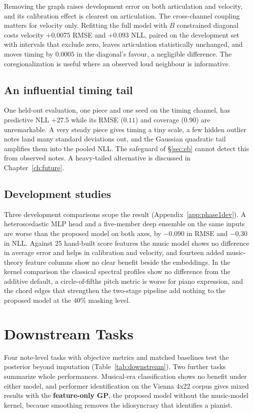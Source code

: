 \documentclass[11pt,a4paper]{report}
\begin{document}
\noindent Removing the graph raises development error on both
articulation and velocity, and its calibration effect is clearest on
articulation. The cross-channel coupling matters for velocity only. Refitting the
full model with $B$ constrained diagonal costs velocity $+0.0075$ RMSE and
$+0.093$ NLL, paired on the development set with intervals that exclude zero,
leaves articulation statistically unchanged, and moves timing by $0.0005$ in
the diagonal's favour, a negligible difference. The coregionalization is
useful where an observed loud neighbour is informative.

\section{An influential timing tail}\label{sec:guard-gp}
One held-out evaluation, one piece and one seed on the timing channel, has
predictive NLL $+27.5$ while its RMSE ($0.11$) and coverage ($0.90$) are
unremarkable. A very steady piece gives timing a tiny scale, a few hidden
outlier notes land many standard deviations out, and the Gaussian quadratic
tail amplifies them into the pooled NLL. The safeguard of \S\ref{sec:eb}
cannot detect this from observed notes. A heavy-tailed alternative is
discussed in Chapter~\ref{ch:future}.

\section{Development studies}\label{sec:devstudies}
Three development comparisons scope the result (Appendix~\ref{app:phase1dev}).
A heteroscedastic MLP head and a five-member deep ensemble on the same
inputs are worse than the proposed model on both axes, by $-0.090$ in RMSE
and $-0.30$ in NLL. Against 25 hand-built score features the music model
shows no difference in average error and helps in calibration and velocity,
and fourteen added music-theory feature columns show no clear benefit beside
the embeddings. In the kernel comparison the classical spectral profiles
show no difference from the additive default, a circle-of-fifths pitch
metric is worse for piano expression, and the chord edges that strengthen
the two-stage pipeline add nothing to the proposed model at the 40\%
masking level.


\chapter{Downstream Tasks}\label{ch:downstream}
Four note-level tasks with objective metrics and matched baselines test the
posterior beyond imputation (Table~\ref{tab:downstream}). Two further tasks
summarize whole performances. Musical-era classification shows no benefit
under either model, and performer identification on the Vienna 4x22 corpus
\cite{goebl1999} gives mixed results with the \textbf{feature-only GP}, the
proposed model without the music-model kernel, because smoothing removes the
idiosyncrasy that identifies a pianist.
\end{document}
